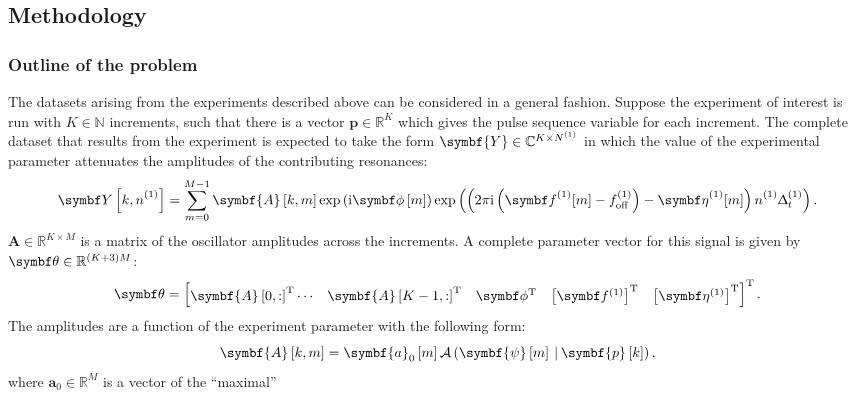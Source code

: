 \subsection{Methodology}


\subsubsection{Outline of the problem}
The datasets arising from the experiments described above can be considered in
a general fashion.
Suppose the experiment of interest is run with $K \in \mathbb{N}$ increments,
such that there is a vector  $\symbf{p} \in \mathbb{R}^K$ which gives the
pulse sequence variable for each increment.
The complete dataset that results from the experiment is expected to take the
form $\symbf{Y} \in \mathbb{C}^{K \times \None}$ in which the value of the
experimental parameter attenuates the amplitudes of the contributing
resonances:
\begin{equation}
    \bY\left[k, \none\right] = \sum_{m=0}^{M-1} \symbf{A}\left[k, m\right]  \exp\left(\iu \bdphim \right)
    \exp\left(\left(2 \pi \iu \left(\bdfone_{\vphantom{\text{off}}} [m] -
    \foffone\right) - \bdetaone_{\vphantom{\text{off}}} [m] \right) \none
\Dtone\right).
\end{equation}
$\symbf{A} \in \mathbb{R}^{K \times M}$ is a matrix of the oscillator amplitudes
across the increments. A complete parameter vector for this
signal is given by $\bth \in \mathbb{R}^{(K + 3)M}$:
\begin{equation}
    \bth =
    \begin{bmatrix}
        \symbf{A}\left[0, :\right]\T \cdots & \symbf{A}\left[K-1, :\right]\T &
        \bdphi\T & \left[\bdfone\right]\T & \left[\bdetaone\right]\T
    \end{bmatrix}\T.
\end{equation}
The amplitudes are a function of the experiment parameter with the following
form:
\begin{equation}
    \symbf{A}\left[k, m\right] =
        \symbf{a}_0 \left[m\right]
        \mathcal{A} \left(
            \symbf{\psi}\left[m\right] \hspace*{2pt} | \hspace*{2pt}
            \symbf{p}\left[k\right]
        \right),
\end{equation}
where $\symbf{a}_0 \in \mathbb{R}^{M}$ is a vector of the ``maximal''
